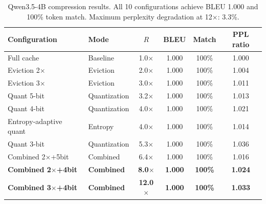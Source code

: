 \documentclass[11pt]{article}
\begin{document}
\begin{table}[htbp]
\centering
\caption{Qwen3.5-4B compression results.  All 10 configurations achieve BLEU 1.000 and 100\% token match.  Maximum perplexity degradation at 12$\times$: 3.3\%.}
\label{tab:qwen35_4b}
\begin{tabular}{@{}llcccc@{}}
\toprule
Configuration & Mode & $R$ & BLEU & Match & PPL ratio \\
\midrule
Full cache & Baseline & 1.0$\times$ & 1.000 & 100\% & 1.000 \\
Eviction 2$\times$ & Eviction & 2.0$\times$ & 1.000 & 100\% & 1.004 \\
Eviction 3$\times$ & Eviction & 3.0$\times$ & 1.000 & 100\% & 1.011 \\
Quant 5-bit & Quantization & 3.2$\times$ & 1.000 & 100\% & 1.013 \\
Quant 4-bit & Quantization & 4.0$\times$ & 1.000 & 100\% & 1.021 \\
Entropy-adaptive quant & Entropy & 4.0$\times$ & 1.000 & 100\% & 1.014 \\
Quant 3-bit & Quantization & 5.3$\times$ & 1.000 & 100\% & 1.036 \\
Combined 2$\times$+5bit & Combined & 6.4$\times$ & 1.000 & 100\% & 1.016 \\
\textbf{Combined 2$\times$+4bit} & \textbf{Combined} & \textbf{8.0$\times$} & \textbf{1.000} & \textbf{100\%} & \textbf{1.024} \\
\textbf{Combined 3$\times$+4bit} & \textbf{Combined} & \textbf{12.0$\times$} & \textbf{1.000} & \textbf{100\%} & \textbf{1.033} \\
\bottomrule
\end{tabular}
\end{table}
\end{document}
